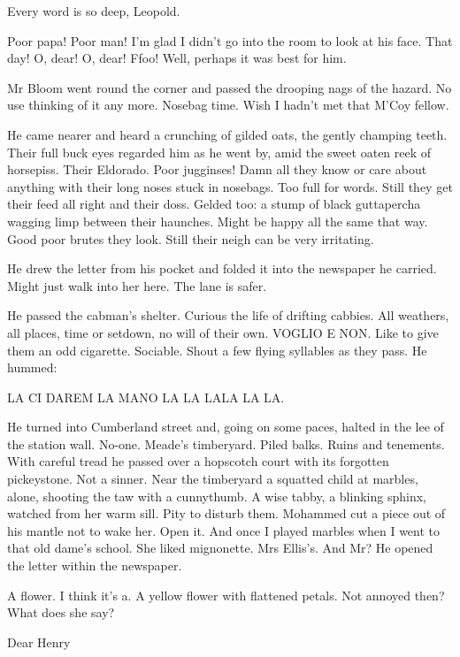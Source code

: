 Every word is so deep, Leopold.

Poor papa! Poor man! I'm glad I didn't go into the room to look at his
face. That day! O, dear! O, dear! Ffoo! Well, perhaps it was best for
him.

Mr Bloom went round the corner and passed the drooping nags of the
hazard. No use thinking of it any more. Nosebag time. Wish I hadn't met
that M'Coy fellow.

He came nearer and heard a crunching of gilded oats, the gently champing
teeth. Their full buck eyes regarded him as he went by, amid the sweet
oaten reek of horsepiss. Their Eldorado. Poor jugginses! Damn all they
know or care about anything with their long noses stuck in nosebags. Too
full for words. Still they get their feed all right and their doss.
Gelded too: a stump of black guttapercha wagging limp between their
haunches. Might be happy all the same that way. Good poor brutes they
look. Still their neigh can be very irritating.

He drew the letter from his pocket and folded it into the newspaper he
carried. Might just walk into her here. The lane is safer.

He passed the cabman's shelter. Curious the life of drifting cabbies. All
weathers, all places, time or setdown, no will of their own. VOGLIO E
NON. Like to give them an odd cigarette. Sociable. Shout a few flying
syllables as they pass. He hummed:


    LA CI DAREM LA MANO
    LA LA LALA LA LA.


He turned into Cumberland street and, going on some paces, halted
in the lee of the station wall. No-one. Meade's timberyard. Piled balks.
Ruins and tenements. With careful tread he passed over a hopscotch court
with its forgotten pickeystone. Not a sinner. Near the timberyard a
squatted child at marbles, alone, shooting the taw with a cunnythumb. A
wise tabby, a blinking sphinx, watched from her warm sill. Pity to disturb
them. Mohammed cut a piece out of his mantle not to wake her. Open it.
And once I played marbles when I went to that old dame's school. She liked
mignonette. Mrs Ellis's. And Mr? He opened the letter within the
newspaper.

A flower. I think it's a. A yellow flower with flattened petals. Not
annoyed then? What does she say?


    Dear Henry

